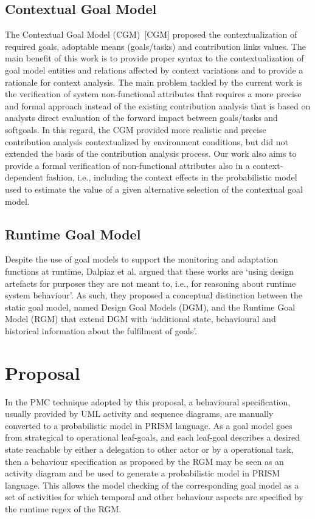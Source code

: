 \section{Contextual Goal Model}

The Contextual Goal Model (CGM)~[CGM] proposed the contextualization of required goals, adoptable means (goals/tasks) and contribution links values. The main benefit of this work is to provide proper syntax to the contextualization of goal model entities and relations affected by context variations and to provide a rationale for context analysis. The main problem tackled by the current work is the verification of system non-functional attributes that requires a more precise and formal approach instead of the existing contribution analysis that is based on analysts direct evaluation of the forward impact between goals/tasks and softgoals. In this regard, the CGM provided more realistic and precise contribution analysis contextualized by environment conditions, but did not extended the basis of the contribution analysis process. Our work also aims to provide a formal verification of non-functional attributes also in a context-dependent fashion, i.e., including the context effects in the probabilistic model used to estimate the value of a given alternative selection of the contextual goal model. 

\section{Runtime Goal Model}

Despite the use of goal models to support the monitoring and adaptation functions at runtime, Dalpiaz et al. argued that these works are `using design artefacts for purposes they are not meant to, i.e., for reasoning about runtime system behaviour'. As such, they proposed a conceptual distinction between the static goal model, named Design Goal Models (DGM), and the Runtime Goal Model (RGM) that extend DGM with `additional state, behavioural and historical information about the fulfilment of goals'.


\chapter{Proposal}\label{ch_proposal}

In the PMC technique adopted by this proposal, a behavioural specification, usually provided by UML activity and sequence diagrams, are manually converted to a probabilistic model in PRISM language. As a goal model goes from strategical to operational leaf-goals, and each leaf-goal describes a desired state reachable by either a delegation to other actor or by a operational task, then a behaviour specification as proposed by the RGM may be seen as an activity diagram and be used to generate a probabilistic model in PRISM language. This allows the model checking of the corresponding goal model as a set of activities for which temporal and other behaviour aspects are specified by the runtime regex of the RGM.
